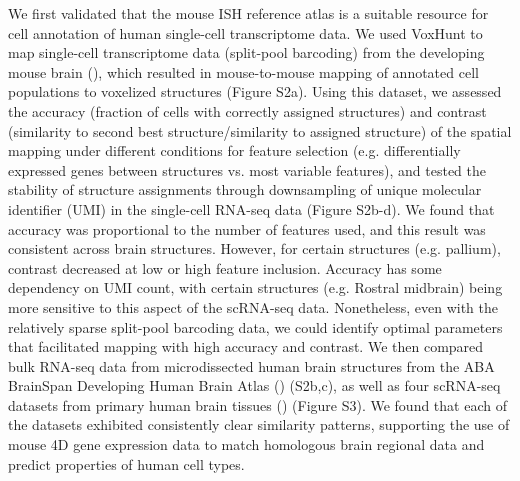 We first validated that the mouse ISH reference atlas is a suitable resource for cell annotation of human single-cell transcriptome data. We used VoxHunt to map single-cell transcriptome data (split-pool barcoding) from the developing mouse brain (\cite{rosenberg_single-cell_2018}), which resulted in mouse-to-mouse mapping of annotated cell populations to voxelized structures (Figure S2a). Using this dataset, we assessed the accuracy (fraction of cells with correctly assigned structures) and contrast (similarity to second best structure/similarity to assigned structure) of the spatial mapping under different conditions for feature selection (e.g. differentially expressed genes between structures vs. most variable features), and tested the stability of structure assignments through downsampling of unique molecular identifier (UMI) in the single-cell RNA-seq data (Figure S2b-d). We found that accuracy was proportional to the number of features used, and this result was consistent across brain structures. However, for certain structures (e.g. pallium), contrast decreased at low or high feature inclusion. Accuracy has some dependency on UMI count, with certain structures (e.g. Rostral midbrain) being more sensitive to this aspect of the scRNA-seq data. Nonetheless, even with the relatively sparse split-pool barcoding data, we could identify optimal parameters that facilitated mapping with high accuracy and contrast. We then compared bulk RNA-seq data from microdissected human brain structures from the ABA BrainSpan Developing Human Brain Atlas (\cite{thompson_high-resolution_2014}) (S2b,c), as well as four scRNA-seq datasets from primary human brain tissues (\cite{fan_spatial_2018,nowakowski_spatiotemporal_2017,polioudakis_single-cell_2019,zhong_single-cell_2018}) (Figure S3). We found that each of the datasets exhibited consistently clear similarity patterns, supporting the use of mouse 4D gene expression data to match homologous brain regional data and predict properties of human cell types.




